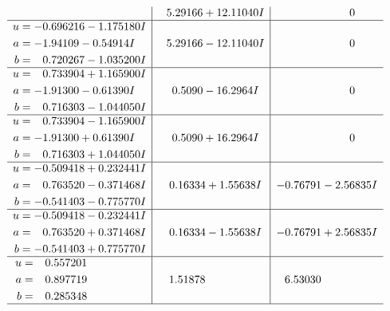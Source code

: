 \documentclass[1p]{elsarticle_modified}
\theoremstyle{definition}
\begin{document}
$$\begin{array}{c|c|c}
 & \phantom{-}5.29166 + 12.11040 I & \phantom{-0.000000 } 0 \\ \hline\begin{aligned}
u &= -0.696216 - 1.175180 I \\
a &= -1.94109 - 0.54914 I \\
b &= \phantom{-}0.720267 - 1.035200 I\end{aligned}
 & \phantom{-}5.29166 - 12.11040 I & \phantom{-0.000000 } 0 \\ \hline\begin{aligned}
u &= \phantom{-}0.733904 + 1.165900 I \\
a &= -1.91300 - 0.61390 I \\
b &= \phantom{-}0.716303 - 1.044050 I\end{aligned}
 & \phantom{-}0.5090 - 16.2964 I & \phantom{-0.000000 } 0 \\ \hline\begin{aligned}
u &= \phantom{-}0.733904 - 1.165900 I \\
a &= -1.91300 + 0.61390 I \\
b &= \phantom{-}0.716303 + 1.044050 I\end{aligned}
 & \phantom{-}0.5090 + 16.2964 I & \phantom{-0.000000 } 0 \\ \hline\begin{aligned}
u &= -0.509418 + 0.232441 I \\
a &= \phantom{-}0.763520 - 0.371468 I \\
b &= -0.541403 - 0.775770 I\end{aligned}
 & \phantom{-}0.16334 + 1.55638 I & -0.76791 - 2.56835 I \\ \hline\begin{aligned}
u &= -0.509418 - 0.232441 I \\
a &= \phantom{-}0.763520 + 0.371468 I \\
b &= -0.541403 + 0.775770 I\end{aligned}
 & \phantom{-}0.16334 - 1.55638 I & -0.76791 + 2.56835 I \\ \hline\begin{aligned}
u &= \phantom{-}0.557201\phantom{ +0.000000I} \\
a &= \phantom{-}0.897719\phantom{ +0.000000I} \\
b &= \phantom{-}0.285348\phantom{ +0.000000I}\end{aligned}
 & \phantom{-}1.51878\phantom{ +0.000000I} & \phantom{-}6.53030\phantom{ +0.000000I}\\
 \hline 
 \end{array}$$\newpage\newpage\renewcommand{\arraystretch}{1}
\end{document}
